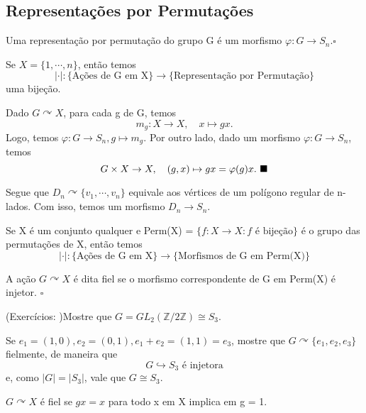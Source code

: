 \documentclass[Algebra/algebra_notes.tex]{subfiles}
\begin{document}
\subsection{Representações por Permutações}
\begin{def*}
	Uma representação por permutação do grupo G é um morfismo \(\varphi :G\rightarrow S_{n}. \square\)
\end{def*}
\begin{prop*}
	Se \(X = \{1, \cdots, n\}\), então temos
	\[
		|\cdot |:\biggl\{\text{Ações de G em X}\biggr\}\rightarrow \biggl\{\text{Representação por Permutação}\biggr\}
	\]
	uma bijeção.
\end{prop*}
\begin{proof*}
	Dado \(G \curvearrowright X\), para cada g de G, temos
	\[
		m_{g}:X\rightarrow X,\quad x\mapsto gx.
	\]
	Logo, temos \(\varphi :G\rightarrow S_{n}, g\mapsto m_{g}.\) Por outro lado, dado um morfismo \(\varphi :G\rightarrow S_{n}\), temos
	\[
		G\times{}X\rightarrow X,\quad (g, x)\mapsto gx = \varphi (g)x.\text{ $\blacksquare$}
	\]
\end{proof*}
\begin{example*}
	Segue que \(D_{n}\curvearrowright \{v_{1}, \cdots, v_{n}\}\) equivale aos vértices de um polígono regular de n-lados. Com isso, temos um morfismo
	\(D_{n}\rightarrow S_{n}\).
\end{example*}
\begin{prop*}
	Se X é um conjunto qualquer e Perm(X) = \(\{f:X\rightarrow X: f \text{ é bijeção}\}\) é o grupo das permutações de X, então temos
	\[
		|\cdot |:\biggl\{\text{Ações de G em X}\biggr\}\rightarrow\biggl\{\text{Morfismos de G em Perm(X)}\biggr\}
	\]
\end{prop*}
\begin{def*}
	A ação \(G \curvearrowright X\) é dita fiel se o morfismo correspondente de G em Perm(X) é injetor. \(\square\)
\end{def*}
\begin{example*}
	(Exercícios: )Mostre que \(G = GL_{2}(\mathbb{Z}/2 \mathbb{Z})\cong{S_{3}}\).

	Se \(e_{1}=(1, 0), e_{2} = (0, 1), e_{1}+e_{2} = (1, 1) = e_{3}\), mostre que \(G \curvearrowright \{e_{1}, e_{2}, e_{3}\}\) fielmente, de maneira que
	\[
		G\hookrightarrow S_{3}\text{ é injetora}
	\]
	e, como \(|G| = |S_{3}|\), vale que \(G\cong{S_{3}.}\)

	\(G \curvearrowright X\) é fiel se \(gx=x\) para todo x em X implica em g = 1.
\end{example*}
\end{document}
